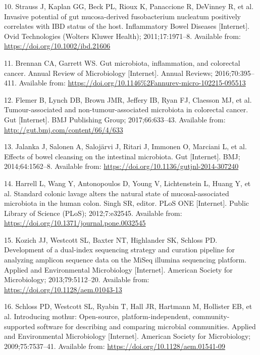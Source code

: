 \documentclass[12pt,]{article}
\begin{document}
\hypertarget{ref-Strauss2011}{}
10. Strauss J, Kaplan GG, Beck PL, Rioux K, Panaccione R, DeVinney R, et
al. Invasive potential of gut mucosa-derived fusobacterium nucleatum
positively correlates with IBD status of the host. Inflammatory Bowel
Diseases {[}Internet{]}. Ovid Technologies (Wolters Kluwer Health);
2011;17:1971--8. Available from: \url{https://doi.org/10.1002/ibd.21606}

\hypertarget{ref-Brennan_2016}{}
11. Brennan CA, Garrett WS. Gut microbiota, inflammation, and colorectal
cancer. Annual Review of Microbiology {[}Internet{]}. Annual Reviews;
2016;70:395--411. Available from:
\url{https://doi.org/10.1146\%2Fannurev-micro-102215-095513}

\hypertarget{ref-Flemer633}{}
12. Flemer B, Lynch DB, Brown JMR, Jeffery IB, Ryan FJ, Claesson MJ, et
al. Tumour-associated and non-tumour-associated microbiota in colorectal
cancer. Gut {[}Internet{]}. BMJ Publishing Group; 2017;66:633--43.
Available from: \url{http://gut.bmj.com/content/66/4/633}

\hypertarget{ref-Jalanka2014}{}
13. Jalanka J, Salonen A, Salojärvi J, Ritari J, Immonen O, Marciani L,
et al. Effects of bowel cleansing on the intestinal microbiota. Gut
{[}Internet{]}. BMJ; 2014;64:1562--8. Available from:
\url{https://doi.org/10.1136/gutjnl-2014-307240}

\hypertarget{ref-Harrell2012}{}
14. Harrell L, Wang Y, Antonopoulos D, Young V, Lichtenstein L, Huang Y,
et al. Standard colonic lavage alters the natural state of
mucosal-associated microbiota in the human colon. Singh SR, editor. PLoS
ONE {[}Internet{]}. Public Library of Science (PLoS); 2012;7:e32545.
Available from: \url{https://doi.org/10.1371/journal.pone.0032545}

\hypertarget{ref-Kozich2013}{}
15. Kozich JJ, Westcott SL, Baxter NT, Highlander SK, Schloss PD.
Development of a dual-index sequencing strategy and curation pipeline
for analyzing amplicon sequence data on the MiSeq illumina sequencing
platform. Applied and Environmental Microbiology {[}Internet{]}.
American Society for Microbiology; 2013;79:5112--20. Available from:
\url{https://doi.org/10.1128/aem.01043-13}

\hypertarget{ref-Schloss2009}{}
16. Schloss PD, Westcott SL, Ryabin T, Hall JR, Hartmann M, Hollister
EB, et al. Introducing mothur: Open-source, platform-independent,
community-supported software for describing and comparing microbial
communities. Applied and Environmental Microbiology {[}Internet{]}.
American Society for Microbiology; 2009;75:7537--41. Available from:
\url{https://doi.org/10.1128/aem.01541-09}
\end{document}
